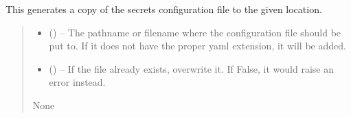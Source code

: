 \documentclass[letterpaper,11pt,english]{sphinxmanual}
\begin{document}
\begin{savenotes}\begin{fulllineitems}
\label{\detokenize{code/opihiexarata.library.config:opihiexarata.library.config.generate_secrets_file_copy}}
\pysigstartsignatures
{}
\pysigstopsignatures
\sphinxAtStartPar
This generates a copy of the secrets configuration file to the given
location.
\begin{quote}\begin{description}
\begin{itemize}
\item {} 
\sphinxAtStartPar
{} () – The pathname or filename where the configuration file should be put
to. If it does not have the proper yaml extension, it will be added.

\item {} 
\sphinxAtStartPar
{} (\sphinxstyleliteralemphasis{\sphinxupquote{, }}) – If the file already exists, overwrite it. If False, it would raise
an error instead.

\end{itemize}

\sphinxAtStartPar
None

\end{description}\end{quote}

\end{fulllineitems}\end{savenotes}

\end{document}
